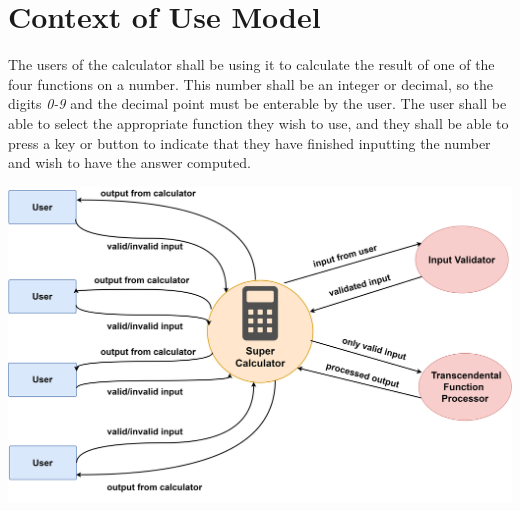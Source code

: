 \documentclass[a4paper, 11pt]{report}
\begin{document}
\section*{Context of Use Model}
\normalsize{The users of the calculator shall be using it to calculate the result of one of the four functions on a number. This number shall be an integer or decimal, so the digits \textit{0-9} and the decimal point must be enterable by the user. The user shall be able to select the appropriate function they wish to use, and they shall be able to press a key or button to indicate that they have finished inputting the number and wish to have the answer computed.}
\begin{center}
\includegraphics[width=15cm]{context_diagram}
\end{center}
\end{document}

